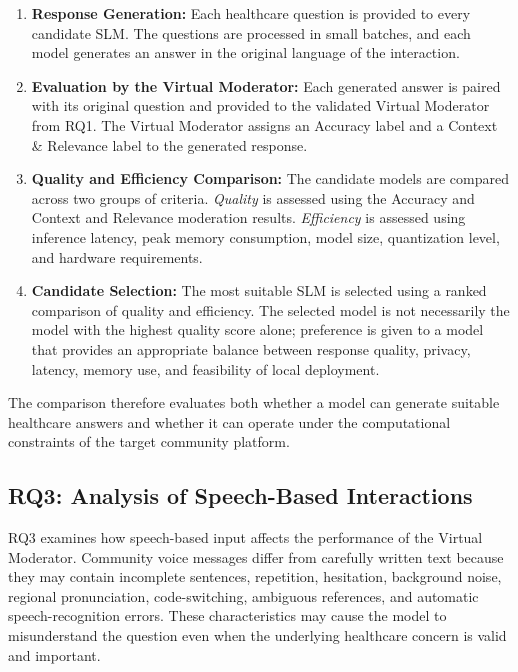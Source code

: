 \documentclass[11pt,a4paper]{article}
\begin{document}
\begin{enumerate}[nosep]
    \item \textbf{Response Generation:}
    Each healthcare question is provided to every candidate SLM. The questions
    are processed in small batches, and each model generates an answer in the
    original language of the interaction.

    \item \textbf{Evaluation by the Virtual Moderator:}
    Each generated answer is paired with its original question and provided to
    the validated Virtual Moderator from RQ1. The Virtual Moderator assigns an
    Accuracy label and a Context \& Relevance label to the generated response.

    \item \textbf{Quality and Efficiency Comparison:}
    The candidate models are compared across two groups of criteria.
    \emph{Quality} is assessed using the Accuracy and Context and Relevance
    moderation results. \emph{Efficiency} is assessed using inference latency,
    peak memory consumption, model size, quantization level, and hardware
    requirements.

    \item \textbf{Candidate Selection:}
    The most suitable SLM is selected using a ranked comparison of quality and
    efficiency. The selected model is not necessarily the model with the
    highest quality score alone; preference is given to a model that provides
    an appropriate balance between response quality, privacy, latency, memory
    use, and feasibility of local deployment.
\end{enumerate}

The comparison therefore evaluates both whether a model can generate suitable
healthcare answers and whether it can operate under the computational
constraints of the target community platform.


\subsection{RQ3: Analysis of Speech-Based Interactions}
\label{subsec:rq3}

RQ3 examines how speech-based input affects the performance of the Virtual
Moderator. Community voice messages differ from carefully written text because
they may contain incomplete sentences, repetition, hesitation, background
noise, regional pronunciation, code-switching, ambiguous references, and
automatic speech-recognition errors. These characteristics may cause the model
to misunderstand the question even when the underlying healthcare concern is
valid and important.
\end{document}
